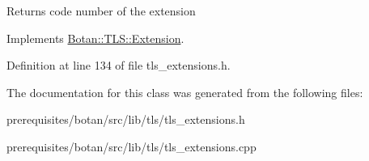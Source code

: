 \begin{DoxyReturn}{Returns}
code number of the extension 
\end{DoxyReturn}


Implements \mbox{\hyperlink{class_botan_1_1_t_l_s_1_1_extension_ac8819b312ce604453225e7b4f7c373ec}{Botan\+::\+T\+L\+S\+::\+Extension}}.



Definition at line 134 of file tls\+\_\+extensions.\+h.



The documentation for this class was generated from the following files\+:\begin{DoxyCompactItemize}
\item 
prerequisites/botan/src/lib/tls/tls\+\_\+extensions.\+h\item 
prerequisites/botan/src/lib/tls/tls\+\_\+extensions.\+cpp\end{DoxyCompactItemize}
